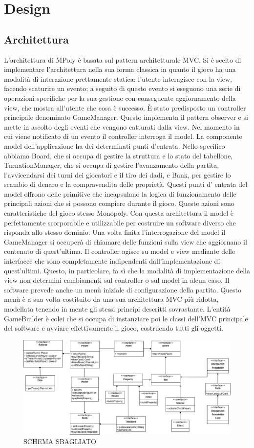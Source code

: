 \chapter{Design}

\section{Architettura}
L’architettura di MPoly è basata sul pattern architetturale MVC.
Si è scelto di implementare l’architettura nella sua forma classica in quanto il gioco 
ha una modalità di interazione prettamente statica: l’utente interagisce con la view, 
facendo scaturire un evento; a seguito di questo evento si eseguono una serie di operazioni 
specifiche per la sua gestione con conseguente aggiornamento della view, che mostra all’utente che cosa è successo.   
È stato predisposto un controller principale denominato GameManager. 
Questo implementa il pattern observer e si mette in ascolto degli eventi che vengono catturati dalla view. 
Nel momento in cui viene notificato di un evento il controller interroga il model.
La componente model dell'applicazione ha dei determinati punti d'entrata. 
Nello specifico abbiamo Board, che si occupa di gestire la struttura e lo stato del tabellone,
TurnationManager, che si occupa di gestire l’avanzamento della partita, l'avvicendarsi dei turni dei giocatori e il tiro dei dadi, 
e Bank, per gestire lo scambio di denaro e la compravendita delle proprietà. 
Questi punti d’ entrata del model offrono delle primitive che incapsulano la logica di funzionamento 
delle principali azioni che si possono compiere durante il gioco. Queste azioni sono caratteristiche del 
gioco stesso Monopoly. 
Con questa architettura il model è perfettamente scorporabile e utilizzabile per costruire 
un software diverso che risponda allo stesso dominio. 
Una volta finita l’interrogazione del model il GameManager si occuperà di chiamare 
delle funzioni sulla view che aggiornano il contenuto di quest’ultima. 
Il controller agisce su model e view mediante delle interfacce che sono completamente indipendenti 
dall’implementazione di quest’ultimi. 
Questo, in particolare, fa sì che la modalità di implementazione della view non determini cambiamenti sul 
controller o sul model in alcun caso. 
Il software prevede anche un menù iniziale di configurazione della partita. 
Questo menù è a sua volta costituito da una sua architettura MVC più ridotta, 
modellata tenendo in mente gli stessi principi descritti sovrastante. 
L’entità GameBuilder è colei che si occupa di instanziare poi le classi dell’MVC principale del software e avviare effettivamente il gioco,
costruendo tutti gli oggetti.

\begin{figure}[H]
    \centering
    \includegraphics[width=0.5\textheight]{img/architecture_diagram1.png}
    \caption{SCHEMA SBAGLIATO}
	\label{img:architecture_diagram1}
\end{figure}
